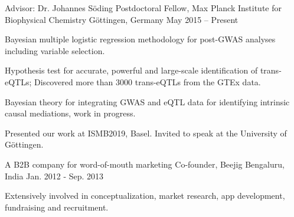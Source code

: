 


\begin{cventries}


\cventry
{Advisor: Dr. Johannes S{\"o}ding} %
{Postdoctoral Fellow, Max Planck Institute for Biophysical Chemistry} %
{G{\"o}ttingen, Germany} %
{May 2015 -- Present} %
{ %
\begin{cvitems}
\item {Bayesian multiple logistic regression methodology for post-GWAS analyses including variable selection.}
\item {Hypothesis test for accurate, powerful and large-scale identification of trans-eQTLs; Discovered more than 3000 trans-eQTLs from the GTEx data.}
\item {Bayesian theory for integrating GWAS and eQTL data for identifying intrinsic causal mediations, work in progress.}
\item {Presented our work at ISMB2019, Basel. Invited to speak at the University of G{\"o}ttingen.}
\end{cvitems}
}


\cventry
{A B2B company for word-of-mouth marketing} %
{Co-founder, Beejig} %
{Bengaluru, India} %
{Jan. 2012 - Sep. 2013} %
{ %
\begin{cvitems}
\item {Extensively involved in conceptualization, market research, app development, fundraising and recruitment.}
\end{cvitems}
}


\end{cventries}
